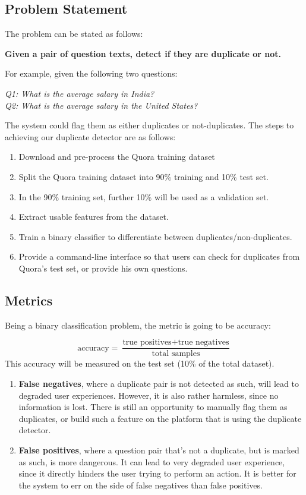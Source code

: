 \documentclass{article}
\begin{document}
\subsection{Problem Statement}

The problem can be stated as follows:

\begin{center}
\textbf{Given a pair of question texts, detect if they are duplicate or not.}
\end{center}
For example, given the following two questions:

\begin{center}
\textit{Q1: What is the average salary in India?}\\
\textit{Q2: What is the average salary in the United States?}
\end{center}
The system could flag them as either duplicates or not-duplicates. The steps to achieving our duplicate detector are as follows:

\begin{enumerate}
\item{Download and pre-process the Quora training dataset}
\item{Split the Quora training dataset into 90\% training and 10\% test set.}
\item{In the 90\% training set, further 10\% will be used as a validation set.}
\item{Extract usable features from the dataset.}
\item{Train a binary classifier to differentiate between duplicates/non-duplicates.}
\item{Provide a command-line interface so that users can check for duplicates from Quora's test set, or provide his own questions.}
\end{enumerate}

\subsection{Metrics}

Being a binary classification problem, the metric is going to be accuracy:

$$\text{accuracy} = \frac{\text{true positives} + \text{true negatives}}{\text{total samples}}$$
This accuracy will be measured on the test set (10\% of the total dataset).

\begin{enumerate}
\item{\textbf{False negatives}, where a duplicate pair is not detected as such, will lead to degraded user experiences. However, it is also rather harmless, since no information is lost. There is still an opportunity to manually flag them as duplicates, or build such a feature on the platform that is using the duplicate detector.}
\item{\textbf{False positives}, where a question pair that's not a duplicate, but is marked as such, is more dangerous. It can lead to very degraded user experience, since it directly hinders the user trying to perform an action. It is better for the system to err on the side of false negatives than false positives.}
\end{enumerate}
\end{document}
